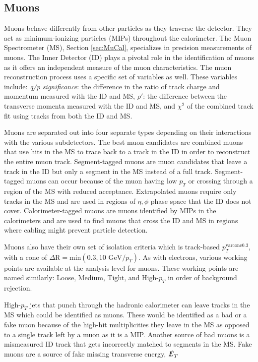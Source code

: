 \subsection{Muons}
Muons behave differently from other particles as they traverse the detector.  They act as minimum-ionizing particles (MIPs) throughout the calorimeter.  The Muon Spectrometer (MS), Section \ref{sec:MuCal}, specializes in precision measurements of muons.  The Inner Detector (ID) plays a pivotal role in the identification of muons as it offers an independent measure of the muon characteristics.  The muon reconstruction process uses a specific set of variables as well\cite{MuonID}.  These variables include: \textit{ q/p significance}: the difference in the ratio of track charge and momentum measured with the ID and MS, $\rho'$: the difference between the transverse momenta measured with the ID and MS, and $\chi^2$ of the combined track fit using tracks from both the ID and MS.

Muons are separated out into four separate types depending on their interactions with the various subdetectors.  The best muon candidates are combined muons that use hits in the MS to trace back to a track in the ID in order to reconstruct the entire muon track.  Segment-tagged muons are muon candidates that leave a track in the ID but only a segment in the MS instead of a full track.  Segment-tagged muons can occur because of the muon having low $p_T$ or crossing through a region of the MS with reduced acceptance.  Extrapolated muons require only tracks in the MS and are used in regions of $\eta, \phi$ phase space that the ID does not cover.  Calorimeter-tagged muons are muons identified by MIPs in the calorimeters and are used to find muons that cross the ID and MS in regions where cabling might prevent particle detection.

Muons also have their own set of isolation criteria which is track-based $p_{T}^{\text{varcone0.3}}$, with a cone of $\Delta \text{R} = \text{min}(0.3,10\text{ GeV}/p_T)$.  As with electrons, various working points are available at the analysis level for muons.  These working points are named similarly: Loose, Medium, Tight, and High-$p_T$ in order of background rejection.  

High-$p_T$ jets that punch through the hadronic calorimeter can leave tracks in the MS which could be identified as muons.  These would be identified as a bad or a fake muon because of the high-hit multiplicities they leave in the MS as opposed to a single track left by a muon as it is a MIP.  Another source of bad muons is a mismeasured ID track that gets incorrectly matched to segments in the MS.  Fake muons are a source of fake missing transverse energy, $ \slashed{E}_T$

